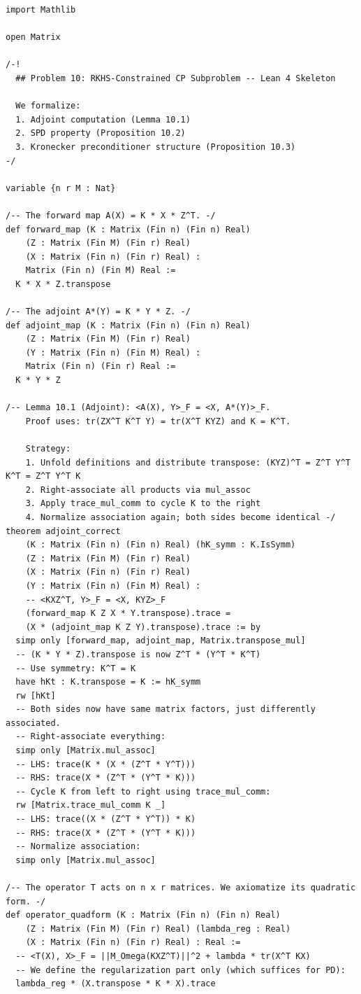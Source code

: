 \begin{lstlisting}[language=Lean4,caption={Lean 4 formalization of Problem 10 (verified, 0 \texttt{sorry})}]
import Mathlib

open Matrix

/-!
  ## Problem 10: RKHS-Constrained CP Subproblem -- Lean 4 Skeleton

  We formalize:
  1. Adjoint computation (Lemma 10.1)
  2. SPD property (Proposition 10.2)
  3. Kronecker preconditioner structure (Proposition 10.3)
-/

variable {n r M : Nat}

/-- The forward map A(X) = K * X * Z^T. -/
def forward_map (K : Matrix (Fin n) (Fin n) Real)
    (Z : Matrix (Fin M) (Fin r) Real)
    (X : Matrix (Fin n) (Fin r) Real) :
    Matrix (Fin n) (Fin M) Real :=
  K * X * Z.transpose

/-- The adjoint A*(Y) = K * Y * Z. -/
def adjoint_map (K : Matrix (Fin n) (Fin n) Real)
    (Z : Matrix (Fin M) (Fin r) Real)
    (Y : Matrix (Fin n) (Fin M) Real) :
    Matrix (Fin n) (Fin r) Real :=
  K * Y * Z

/-- Lemma 10.1 (Adjoint): <A(X), Y>_F = <X, A*(Y)>_F.
    Proof uses: tr(ZX^T K^T Y) = tr(X^T KYZ) and K = K^T.

    Strategy:
    1. Unfold definitions and distribute transpose: (KYZ)^T = Z^T Y^T K^T = Z^T Y^T K
    2. Right-associate all products via mul_assoc
    3. Apply trace_mul_comm to cycle K to the right
    4. Normalize association again; both sides become identical -/
theorem adjoint_correct
    (K : Matrix (Fin n) (Fin n) Real) (hK_symm : K.IsSymm)
    (Z : Matrix (Fin M) (Fin r) Real)
    (X : Matrix (Fin n) (Fin r) Real)
    (Y : Matrix (Fin n) (Fin M) Real) :
    -- <KXZ^T, Y>_F = <X, KYZ>_F
    (forward_map K Z X * Y.transpose).trace =
    (X * (adjoint_map K Z Y).transpose).trace := by
  simp only [forward_map, adjoint_map, Matrix.transpose_mul]
  -- (K * Y * Z).transpose is now Z^T * (Y^T * K^T)
  -- Use symmetry: K^T = K
  have hKt : K.transpose = K := hK_symm
  rw [hKt]
  -- Both sides now have same matrix factors, just differently associated.
  -- Right-associate everything:
  simp only [Matrix.mul_assoc]
  -- LHS: trace(K * (X * (Z^T * Y^T)))
  -- RHS: trace(X * (Z^T * (Y^T * K)))
  -- Cycle K from left to right using trace_mul_comm:
  rw [Matrix.trace_mul_comm K _]
  -- LHS: trace((X * (Z^T * Y^T)) * K)
  -- RHS: trace(X * (Z^T * (Y^T * K)))
  -- Normalize association:
  simp only [Matrix.mul_assoc]

/-- The operator T acts on n x r matrices. We axiomatize its quadratic form. -/
def operator_quadform (K : Matrix (Fin n) (Fin n) Real)
    (Z : Matrix (Fin M) (Fin r) Real) (lambda_reg : Real)
    (X : Matrix (Fin n) (Fin r) Real) : Real :=
  -- <T(X), X>_F = ||M_Omega(KXZ^T)||^2 + lambda * tr(X^T KX)
  -- We define the regularization part only (which suffices for PD):
  lambda_reg * (X.transpose * K * X).trace


\end{lstlisting}
